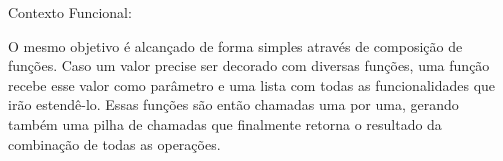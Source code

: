 Contexto Funcional:

O mesmo objetivo é alcançado de forma simples através de 
composição de funções. Caso um valor precise ser decorado 
com diversas funções, uma função recebe esse valor como 
parâmetro e uma lista com todas as funcionalidades que irão 
estendê-lo. Essas funções são então chamadas uma por uma, 
gerando também uma pilha de chamadas que finalmente 
retorna o resultado da combinação de todas as operações.

\begin{lstlisting}[caption={Decorator Funcional},label=fpdecorator]
    

    
\end{lstlisting}
